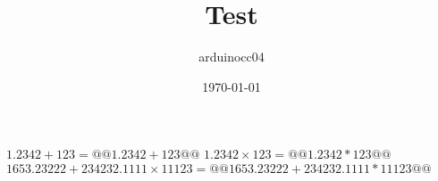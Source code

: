 \documentclass[chapter, a4paper]{oblivoir}
\author{arduinocc04}
\date{\today}
\title{Test}
\begin{document}
    \maketitle
    $1.2342 + 123 = @@1.2342 + 123@@$
    $1.2342 \times 123 = @@1.2342*123@@$
    $1653.23222 + 234232.1111 \times 11123 = @@1653.23222 + 234232.1111 * 11123@@$
\end{document}
